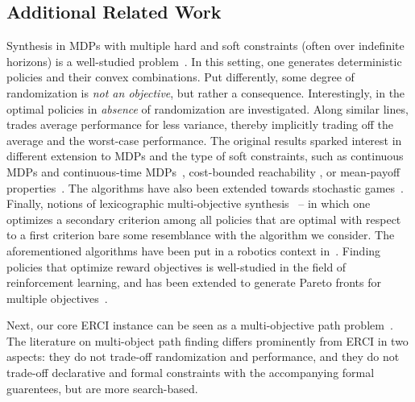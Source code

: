\subsection{Additional Related Work}
 
Synthesis in MDPs with multiple hard and soft constraints (often over indefinite horizons) is a well-studied problem~\cite{DBLP:conf/stacs/ChatterjeeMH06,DBLP:conf/tacas/EtessamiKVY07,DBLP:conf/atva/ForejtKP12,DBLP:journals/fmsd/RandourRS17}.  In this setting, one generates deterministic policies and their convex combinations. Put differently, some degree of randomization is \emph{not an objective}, but rather a consequence. Interestingly, in \cite{DBLP:conf/tacas/DelgrangeKQR20} the optimal policies in \emph{absence} of randomization are investigated. Along similar lines, \cite{DBLP:journals/jcss/BrazdilCFK17} trades average performance for less variance, thereby implicitly trading off the average and the worst-case performance.  
The original results sparked interest in different extension to MDPs and the type of soft constraints, such as continuous MDPs \cite{DBLP:journals/csysl/HaesaertNS21} and continuous-time MDPs~\cite{DBLP:conf/cav/QuatmannJK17},  cost-bounded reachability \cite{DBLP:journals/jar/HartmannsJKQ20}, or mean-payoff properties~\cite{DBLP:journals/corr/abs-1104-3489}. 
The algorithms have also been extended towards stochastic games~\cite{DBLP:conf/mfcs/ChenFKSW13,DBLP:journals/sttt/KwiatkowskaPW18}.
Finally, notions of lexicographic multi-objective synthesis~\cite{DBLP:conf/cav/ChatterjeeKWW20} -- in which one optimizes a secondary criterion among all policies that are optimal with respect to a first criterion bare some resemblance with the algorithm we consider. 
The aforementioned algorithms have been put in a robotics context in~\cite{DBLP:journals/ijrr/LacerdaFPH19}.
Finding policies that optimize reward objectives is well-studied in the field of reinforcement learning, and has been extended to generate Pareto fronts for multiple objectives~\cite{DBLP:conf/icml/NatarajanT05,DBLP:conf/adprl/ParisiPSBR14}.

Next, our core ERCI instance can be seen as a multi-objective path problem~\cite{DBLP:conf/icra/AmigoniG05,DBLP:journals/eswa/NazarahariKD19,DBLP:conf/icml/XuTMRSM20}.
The literature on multi-object path finding differs prominently from ERCI in two aspects: they do not trade-off
randomization and performance, and they do not trade-off declarative
and formal constraints with the accompanying formal guarentees, but
are more search-based.

